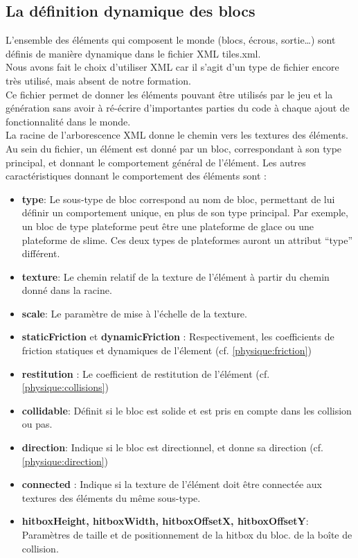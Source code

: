 \documentclass[10pt]{report}
\begin{document}
\subsection{La définition dynamique des blocs}
L'ensemble des éléments qui composent le monde (blocs, écrous, sortie\ldots) sont définis de manière dynamique dans le fichier XML tiles.xml.\\
Nous avons fait le choix d'utiliser XML car il s'agit d'un type de fichier encore très utilisé, mais absent de notre formation.\\
Ce fichier permet de donner les éléments pouvant être utilisés par le jeu et la génération sans avoir à ré-écrire d'importantes parties du code à chaque ajout de fonctionnalité dans le monde.\\
La racine de l'arborescence XML donne le chemin vers les textures des éléments.\\
Au sein du fichier, un élément est donné par un bloc, correspondant à son type principal, et donnant le comportement général de l'élément.
Les autres caractéristiques donnant le comportement des éléments sont :\\
\begin{itemize}
  \item \textbf{type}: Le sous-type de bloc correspond au nom de bloc, permettant de lui définir un comportement unique, en plus de son type principal.
  Par exemple, un bloc de type plateforme peut être une plateforme de glace ou une plateforme de slime.
  Ces deux types de plateformes auront un attribut ``type'' différent.
  \item \textbf{texture}: Le chemin relatif de la texture de l'élément à partir du chemin donné dans la racine.
  \item \textbf{scale}: Le paramètre de mise à l'échelle de la texture.
  \item \textbf{staticFriction} et \textbf{dynamicFriction} : Respectivement, les coefficients de friction statiques et dynamiques de l'élement (cf. \ref{physique:friction})
  \item \textbf{restitution} : Le coefficient de restitution de l'élément (cf. \ref{physique:collisions})
  \item \textbf{collidable}: Définit si le bloc est solide et est pris en compte dans les collision ou pas.
  \item \textbf{direction}: Indique si le bloc est directionnel, et donne sa direction (cf. \ref{physique:direction})
  \item \textbf{connected} : Indique si la texture de l'élément doit être connectée aux textures des éléments du même sous-type.
  \item \textbf{hitboxHeight, hitboxWidth, hitboxOffsetX, hitboxOffsetY}: Paramètres de taille et de positionnement de la hitbox du bloc.
  de la boîte de collision.
\end{itemize}
\end{document}
